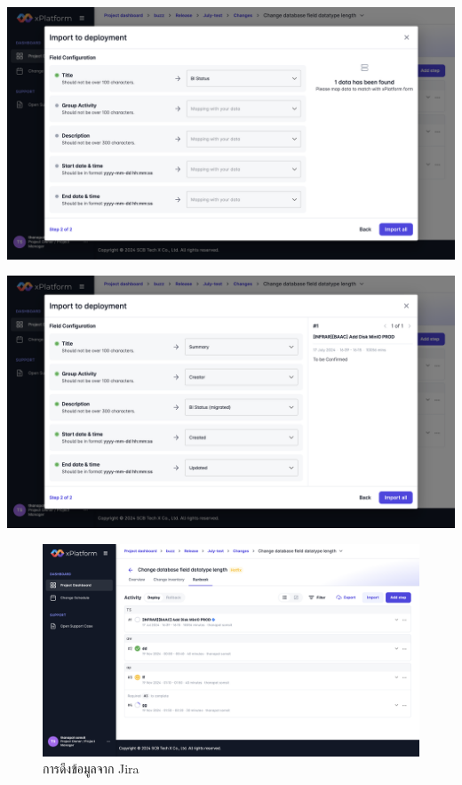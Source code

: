 \begin{center}
    \includegraphics[width=\linewidth]{resources/pages/change-runbook/import-jira/26.png}

    \vspace{1in}

    \includegraphics[width=\linewidth]{resources/pages/change-runbook/import-jira/27.png}
\end{center}

\begin{figure}[H]
    \begin{center}
        \includegraphics[width=\linewidth]{resources/pages/change-runbook/import-jira/28.png}
    \end{center}
    \caption[การดึงข้อมูลจาก Jira]{การดึงข้อมูลจาก Jira}
  \label{fig:import-jira}
\end{figure}


